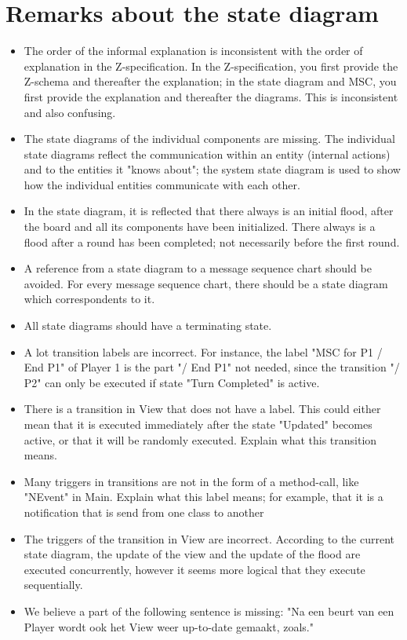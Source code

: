 \documentclass[a4paper,11pt]{article}
\begin{document}
	\section{Remarks about the state diagram}
    \begin{itemize}
        \item The order of the informal explanation is inconsistent with the order of explanation in the Z-specification. In the Z-specification, you first provide the Z-schema and thereafter the explanation; in the state diagram and MSC, you first provide the explanation and thereafter the diagrams. This is inconsistent and also confusing.
        \item The state diagrams of the individual components are missing. The individual state diagrams reflect the communication within an entity (internal actions) and to the entities it "knows about"; the system state diagram is used to show how the individual entities communicate with each other.
        \item In the state diagram, it is reflected that there always is an initial flood, after the board and all its components have been initialized. There always is a flood after a round has been completed; not necessarily before the first round.
        \item A reference from a state diagram to a message sequence chart should be avoided. For every message sequence chart, there should be a state diagram which correspondents to it.
        \item All state diagrams should have a terminating state.
        \item A lot transition labels are incorrect. For instance, the label "MSC for P1 / End P1" of Player 1 is the part "/ End P1" not needed, since the transition "/ P2" can only be executed if state "Turn Completed" is active.
        \item There is a transition in View that does not have a label. This could either mean that it is executed immediately after the state "Updated" becomes active, or that it will be randomly executed. Explain what this transition means.
        \item Many triggers in transitions are not in the form of a method-call, like "NEvent" in Main. Explain what this label means; for example, that it is a notification that is send from one class to another
        \item The triggers of the transition in View are incorrect. According to the current state diagram, the update of the view and the update of the flood are executed concurrently, however it seems more logical that they execute sequentially.
        \item We believe a part of the following sentence is missing: "Na een beurt van een Player wordt ook het View weer up-to-date gemaakt, zoals."
    \end{itemize}
\end{document}
